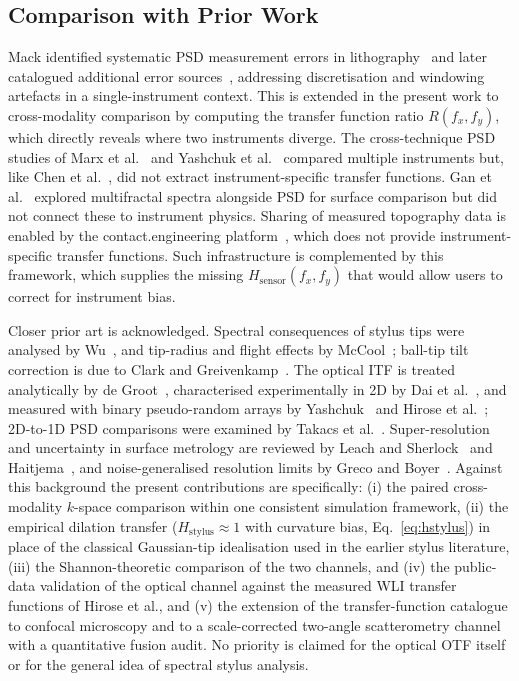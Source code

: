 \documentclass[review,12pt]{elsarticle}
\begin{document}
\subsection{Comparison with Prior Work}

Mack identified systematic PSD measurement errors in lithography~\cite{mack2013systematic} and later catalogued additional error sources~\cite{mack2015more}, addressing discretisation and windowing artefacts in a single-instrument context. This is extended in the present work to cross-modality comparison by computing the transfer function ratio $R(f_x,f_y)$, which directly reveals where two instruments diverge. The cross-technique PSD studies of Marx et al.~\cite{marx2002power} and Yashchuk et al.~\cite{yashchuk2005crosscheck} compared multiple instruments but, like Chen et al.~\cite{chen2010comparison}, did not extract instrument-specific transfer functions. Gan et al.~\cite{gan2007comparative} explored multifractal spectra alongside PSD for surface comparison but did not connect these to instrument physics. Sharing of measured topography data is enabled by the contact.engineering platform~\cite{rottger2022contact}, which does not provide instrument-specific transfer functions. Such infrastructure is complemented by this framework, which supplies the missing $H_\mathrm{sensor}(f_x,f_y)$ that would allow users to correct for instrument bias.

Closer prior art is acknowledged. Spectral consequences of stylus tips were analysed by Wu~\cite{wu1999spectral,wu2000spectral}, and tip-radius and flight effects by McCool~\cite{mccool1984assessing}; ball-tip tilt correction is due to Clark and Greivenkamp~\cite{clark2002ball}. The optical ITF is treated analytically by de Groot~\cite{degroot2021itf}, characterised experimentally in 2D by Dai et al.~\cite{dai2020material}, and measured with binary pseudo-random arrays by Yashchuk~\cite{yashchuk2015binary} and Hirose et al.~\cite{hirose2025topography}; 2D-to-1D PSD comparisons were examined by Takacs et al.~\cite{takacs2010two}. Super-resolution and uncertainty in surface metrology are reviewed by Leach and Sherlock~\cite{leach2013super} and Haitjema~\cite{haitjema2015uncertainty}, and noise-generalised resolution limits by Greco and Boyer~\cite{greco2019angular}. Against this background the present contributions are specifically: (i) the paired cross-modality $k$-space comparison within one consistent simulation framework, (ii) the empirical dilation transfer ($H_\mathrm{stylus} \approx 1$ with curvature bias, Eq.~\ref{eq:hstylus}) in place of the classical Gaussian-tip idealisation used in the earlier stylus literature, (iii) the Shannon-theoretic comparison of the two channels, and (iv) the public-data validation of the optical channel against the measured WLI transfer functions of Hirose et al., and (v) the extension of the transfer-function catalogue to confocal microscopy and to a scale-corrected two-angle scatterometry channel with a quantitative fusion audit. No priority is claimed for the optical OTF itself or for the general idea of spectral stylus analysis.
\end{document}
